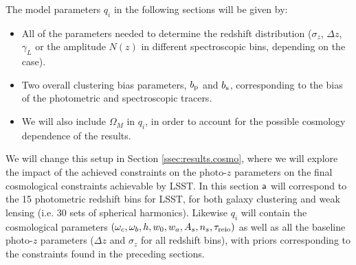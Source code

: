 \documentclass[prd,twocolumn]{revtex4}
\begin{document}
  The model parameters $q_i$ in the following sections will be given by:
  \begin{itemize}
    \item All of the parameters needed to determine the redshift distribution
          ($\sigma_z$, $\Delta z$, $\gamma_L$ or the amplitude $N(z)$ in different
          spectroscopic bins, depending on the case).
    \item Two overall clustering bias parameters, $b_{\rm p}$ and $b_{\rm s}$,
          corresponding to the bias of the photometric and spectroscopic tracers.
    \item We will also include $\Omega_M$ in $q_i$, in order to account for the
          possible cosmology dependence of the results.
  \end{itemize}
  
  We will change this setup in Section \ref{ssec:results.cosmo}, where we will
  explore the impact of the achieved constraints on the photo-$z$ parameters on
  the final cosmological constraints achievable by LSST. In this section
  ${\sf a}$ will correspond to the 15 photometric redshift bins for LSST, for
  both galaxy clustering and weak lensing (i.e. 30 sets of spherical harmonics).
  Likewise $q_i$ will contain the cosmological parameters
  $(\omega_c,\omega_b,h,w_0,w_a,A_s,n_s,\tau_{\rm reio})$ as well as all the
  baseline photo-$z$ parameters ($\Delta z$ and $\sigma_z$ for all redshift
  bins), with priors corresponding to the constraints found in the preceding
  sections.
\end{document}
